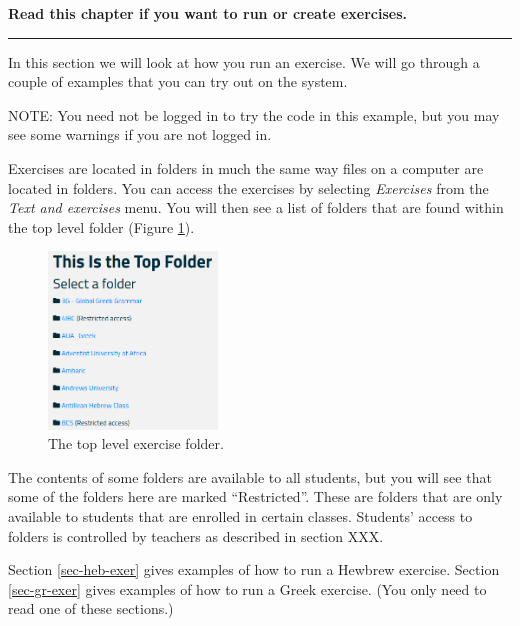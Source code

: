 \documentclass[11pt,oneside,a4paper]{memoir}
\begin{document}
\textbf{Read this chapter if you want to run or create exercises.}
\plainbreak{3}

In this section we will look at how you run an exercise. We will go through a couple of examples
that you can try out on the system.

NOTE: You need not be logged in to try the code in this example, but you may see some warnings if
you are not logged in.

Exercises are located in folders in much the same way files on a computer are located in folders.
You can access the exercises by selecting \emph{Exercises} from the \emph{Text and exercises} menu.
You will then see a list of folders that are found within the top level folder (Figure \ref{fig-top-level}).
\begin{figure}
  \begin{center}
    \includegraphics[width=0.4\textwidth]{toplevel.png}
  \end{center}
  \caption{The top level exercise folder.}\label{fig-top-level}
\end{figure}
The contents of some folders are available to all students, but you will see that some of the
folders here are marked ``Restricted''. These are folders that are only available to students that
are enrolled in certain classes. Students' access to folders is controlled by teachers as described
in section XXX.

Section \ref{sec-heb-exer} gives examples of how to run a Hewbrew exercise. Section
\ref{sec-gr-exer} gives examples of how to run a Greek exercise. (You only need to read one of these
sections.)
\end{document}
